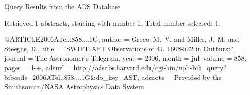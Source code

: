 Query Results from the ADS Database


Retrieved 1 abstracts, starting with number 1.  Total number selected: 1.

@ARTICLE{2006ATel..858....1G,
   author = {{Greco}, M.~V. and {Miller}, J.~M. and {Steeghs}, D.},
    title = "{SWIFT XRT Observations of 4U 1608-522 in Outburst}",
  journal = {The Astronomer's Telegram},
     year = 2006,
    month = jul,
   volume = 858,
    pages = {1-+},
   adsurl = {http://adsabs.harvard.edu/cgi-bin/nph-bib_query?bibcode=2006ATel..858....1G&db_key=AST},
  adsnote = {Provided by the Smithsonian/NASA Astrophysics Data System}
}


